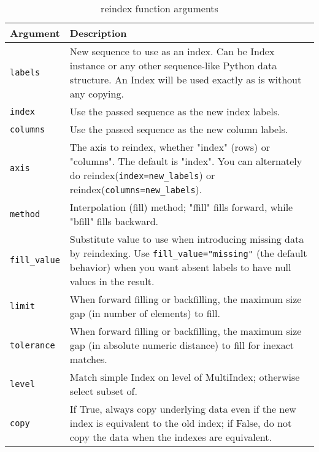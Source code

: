 \begin{table}
    \caption{reindex function arguments}
    \label{reindex function arguments}
    \begin{tabularx}{\textwidth}{lX}
        \hline
        Argument          & Description                                                                                                                                                                                \\
        \hline
        \verb|labels|     & New sequence to use as an index. Can be Index instance or any other sequence-like Python data structure. An Index will be used exactly as is without any copying.                          \\
        \verb|index|      & Use the passed sequence as the new index labels.                                                                                                                                           \\
        \verb|columns|    & Use the passed sequence as the new column labels.                                                                                                                                          \\
        \verb|axis|       & The axis to reindex, whether "index" (rows) or "columns". The default is "index". You can alternately do reindex(\verb|index=new_labels|) or reindex(\verb|columns=new_labels|).           \\
        \verb|method|     & Interpolation (fill) method; "ffill" fills forward, while "bfill" fills backward.                                                                                                          \\
        \verb|fill_value| & Substitute value to use when introducing missing data by reindexing. Use \verb|fill_value="missing"| (the default behavior) when you want absent labels to have null values in the result. \\
        \verb|limit|      & When forward filling or backfilling, the maximum size gap (in number of elements) to fill.                                                                                                 \\
        \verb|tolerance|  & When forward filling or backfilling, the maximum size gap (in absolute numeric distance) to fill for inexact matches.                                                                      \\
        \verb|level|      & Match simple Index on level of MultiIndex; otherwise select subset of.                                                                                                                     \\
        \verb|copy|       & If True, always copy underlying data even if the new index is equivalent to the old index; if False, do not copy the data when the indexes are equivalent.                                 \\
        \hline
    \end{tabularx}
\end{table}

